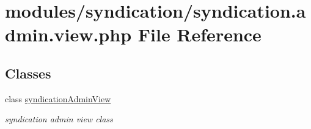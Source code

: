 \hypertarget{syndication_8admin_8view_8php}{\section{modules/syndication/syndication.admin.\-view.\-php File Reference}
\label{syndication_8admin_8view_8php}
}
\subsection*{Classes}
\begin{DoxyCompactItemize}
\item 
class \hyperlink{classsyndicationAdminView}{syndication\-Admin\-View}
\begin{DoxyCompactList}\small\item\em syndication admin view class \end{DoxyCompactList}\end{DoxyCompactItemize}
